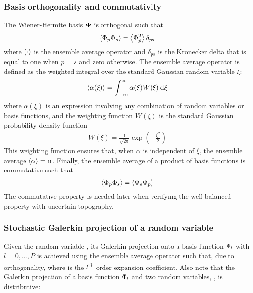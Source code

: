 \subsubsection*{Basis orthogonality and commutativity}
The Wiener-Hermite basis $\bm{\Phi}$ is orthogonal such that
\begin{align}
	\left\langle \Phi_p \Phi_s \right\rangle = \left\langle \Phi_p^2 \right\rangle \delta_{ps}
\end{align}
where $\left\langle \cdot \right\rangle$ is the ensemble average operator and $\delta_{ps}$ is the Kronecker delta that is equal to one when $p = s$ and zero otherwise.
The ensemble average operator is defined as the weighted integral over the standard Gaussian random variable $\xi$:
\begin{align}
	\left\langle \alpha(\xi) \right\rangle = \int_{-\infty}^\infty \alpha(\xi) W(\xi) \:\mathrm{d} \xi \label{eqn:ensemble-average}
\end{align}
where $\alpha(\xi)$ is an expression involving any combination of random variables or basis functions, and the weighting function $W(\xi)$ is the standard Gaussian probability density function
\begin{align}
	W(\xi) = \frac{1}{\sqrt{2\pi}} \exp \left(-\frac{\xi^2}{2}\right)
\end{align}
This weighting function ensures that, when $\alpha$ is independent of $\xi$, the ensemble average $\left\langle \alpha \right\rangle = \alpha$.
Finally, the ensemble average of a product of basis functions is commutative such that
\begin{align}
    \left\langle \Phi_p \Phi_s \right\rangle = \left\langle \Phi_s \Phi_p \right\rangle
    \label{eqn:commutative}
\end{align}
The commutative property is needed later when verifying the well-balanced property with uncertain topography.

\subsubsection*{Stochastic Galerkin projection of a random variable}
Given the random variable , its Galerkin projection onto a basis function $\Phi_l$ with $l = 0, \ldots, P$ is achieved using the ensemble average operator such that, due to orthogonality,
where  is the $l$\textsuperscript{th} order expansion coefficient.
Also note that the Galerkin projection of a basis function $\Phi_l$ and two random variables, , is distributive:

